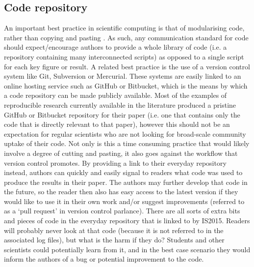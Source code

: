 \subsection{Code repository}

An important best practice in scientific computing is that of modularising code, rather than copying and pasting \citep{Wilson2014a}. As such, any communication standard for code should expect/encourage authors to provide a whole library of code (i.e. a repository containing many interconnected scripts) as opposed to a single script for each key figure or result. A related best practice is the use of a version control system like Git, Subversion or Mercurial. These systems are easily linked to an online hosting service such as GitHub or Bitbucket, which is the means by which a code repository can be made publicly available. Most of the examples of reproducible research currently available in the literature produced a pristine GitHub or Bitbucket repository for their paper (i.e. one that contains only the code that is directly relevant to that paper), however this should not be an expectation for regular scientists who are not looking for broad-scale community uptake of their code. Not only is this a time consuming practice that would likely involve a degree of cutting and pasting, it also goes against the workflow that version control promotes. By providing a link to their everyday repository instead, authors can quickly and easily signal to readers what code was used to produce the results in their paper. The authors may further develop that code in the future, so the reader then also has easy access to the latest version if they would like to use it in their own work and/or suggest improvements (referred to as a `pull request' in version control parlance). There are all sorts of extra bits and pieces of code in the everyday repository that is linked to by IS2015. Readers will probably never look at that code (because it is not referred to in the associated log files), but what is the harm if they do? Students and other scientists could potentially learn from it, and in the best case scenario they would inform the authors of a bug or potential improvement to the code.        

